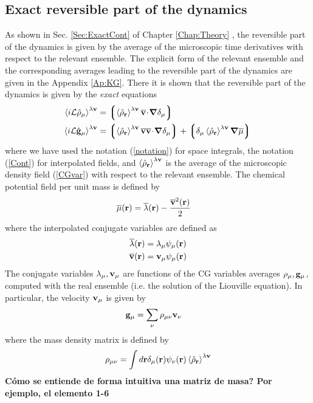 \documentclass[b5paper,openright,11pt]{book}
\newcommand{\esc}{\!\cdot\!}
\newcommand{\Note}[1]{{\bf \color{red}#1}}    %
\newcommand{\llangle}{\left\langle}
\newcommand{\rrangle}{\right\rangle}
\newcommand{\llg}{\left\lgroup}
\newcommand{\rlg}{\right\rgroup}
\begin{document}
\subsection{Exact reversible part of the dynamics}
As shown in Sec. \ref{Sec:ExactCont} of Chapter \ref{Chap:Theory} , the reversible part
of  the dynamics  is  given by  the average  of  the microscopic  time
derivatives with respect to the  relevant ensemble.  The explicit form
of the relevant ensemble and the corresponding averages leading to the
reversible  part   of  the   dynamics  are   given  in   the  Appendix
\ref{Ap:KG}.  There  it is  shown  that  the  reversible part  of  the
dynamics is given by the \textit{exact} equations
\begin{align}
  \llangle i{\cal L}\hat{\rho}_\mu\rrangle^{\lambda{\bf v}} &=
  \llg\llangle \hat{\rho}_{\bf r}\rrangle^{\lambda{\bf v}}
\overline{\bf v}\esc\boldsymbol{\nabla}\delta_{\mu}\rlg
\nonumber\\
  \llangle i{\cal L}\hat{\bf g}_\mu\rrangle^{\lambda{\bf v}} &=
\llg\llangle \hat{\rho}_{\bf r}\rrangle^{\lambda{\bf v}}
\overline{\bf v}\overline{\bf v}\esc\boldsymbol{\nabla}\delta_{\mu}\rlg
+\llg\delta_\mu\llangle\hat{\rho}_{\bf r}\rrangle^{\lambda{\bf v}}\boldsymbol{\nabla}\overline{\mu}\rlg
\label{ExactRev}
\end{align}
where we have used the  notation (\ref{notation}) for space integrals,
the  notation  (\ref{Cont})  for interpolated  fields,  and  $\llangle
\hat{\rho}_{\bf  r}\rrangle^{\lambda{\bf v}}$  is the  average of  the
microscopic  density field  (\ref{CGvar})  with  respect to  the
relevant  ensemble.  The  chemical potential  field per  unit mass  is
defined by
\begin{align}
  \overline{\mu}({\bf r})&=\overline{\lambda}({\bf r})-\frac{\overline{\bf v}^2({\bf r})}{2}
\end{align}
where the interpolated conjugate variables are defined as
\begin{align}
  \overline{\lambda}({\bf r})&={\lambda}_{\mu}\psi_\mu({\bf r})
\nonumber\\
  \overline{\bf v}({\bf r})&={\bf v}_{\mu}\psi_\mu({\bf r})
\end{align}
The conjugate variables $\lambda_\mu,{\bf v}_\mu$ are functions of the
CG variables averages $\rho_\mu,{\bf g}_\mu$, computed with the real ensemble (i.e. the solution of the Liouville equation). In particular, the velocity ${\bf
  v}_\mu$ is given by
\begin{align}
  {\bf g}_\mu&=\sum_{\nu}\rho_{\mu\nu}{\bf v}_\nu
\label{vnu}
\end{align}
where  the mass density matrix is defined by
\begin{align}
  \rho_{\mu\nu} =\int d{\bf r}
\delta_\mu({\bf r})\psi_\nu({\bf r})\llangle\hat{\rho}_{\bf r}\rrangle^{\lambda{\bf v}}
\label{rhomunu}
\end{align}
\Note{Cómo se entiende de forma intuitiva una matriz de masa? Por ejemplo, el elemento 1-6}
\end{document}
